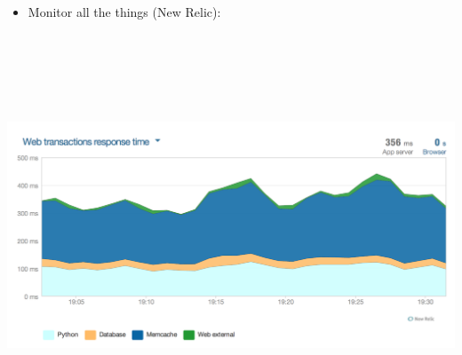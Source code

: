 \documentclass[landscape]{slides}
\begin{document}
\begin{slide}

    \begin{itemize}
        \item Monitor all the things (New Relic):
    \end{itemize}

    \begin{center}
        \includegraphics[height=12cm]{web-transactions-1}
    \end{center}

\end{slide}
\end{document}
